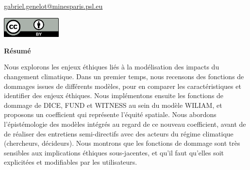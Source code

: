 \begin{titlepage}

\begin{center}

{\makeatletter
\largetitlestyle\fontsize{45}{45}\selectfont\@title
\makeatother}

{\makeatletter
\ifdefvoid{\@subtitle}{}{\bigskip\titlestyle\fontsize{20}{20}\selectfont\@subtitle}
\makeatother}


\bigskip
\bigskip

{\makeatletter
\largetitlestyle\fontsize{25}{25}\selectfont\@author
\makeatother}

\bigskip

\href{mailto:gabriel.genelot@minesparis.psl.eu}{gabriel.genelot@minesparis.psl.eu}

\bigskip
\bigskip


\begin{centering}
    \includegraphics[width=3cm]{illustrations/ccby.png} %
\end{centering}


\vfill

\textbf{Résumé} \\

\begin{center}
\justify


Nous explorons les enjeux éthiques liés à la modélisation des impacts du changement climatique. Dans un premier temps, nous recensons des fonctions de dommages issues de différents modèles, pour en comparer les caractéristiques et identifier des enjeux éthiques. Nous implémentons ensuite les fonctions de dommage de DICE, FUND et WITNESS au sein du modèle WILIAM, et proposons un coefficient qui représente l'équité spatiale. Nous abordons l'épistémologie des modèles intégrés au regard de ce nouveau coefficient, avant de de réaliser des entretiens semi-directifs avec des acteurs du régime climatique (chercheurs, décideurs). Nous montrons que les fonctions de dommage sont très sensibles aux implications éthiques sous-jacentes, et qu'il faut qu'elles soit explicitées et modifiables par les utilisateurs. 


\end{center}
\end{center}
\end{titlepage}
